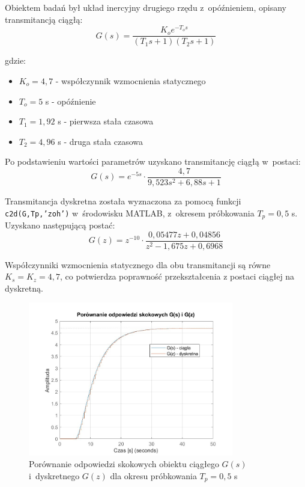 \documentclass[a4paper,titlepage,11pt,floatssmall]{mwrep}
\begin{document}
Obiektem badań był układ inercyjny drugiego rzędu z~opóźnieniem, opisany transmitancją ciągłą:
\begin{equation}
    G(s) = \frac{K_o e^{-T_o s}}{(T_1 s + 1)(T_2 s + 1)}
\end{equation}

gdzie:
\begin{itemize}
    \item $K_o = 4,7$ - współczynnik wzmocnienia statycznego
    \item $T_o = 5$ s - opóźnienie
    \item $T_1 = 1,92$ s - pierwsza stała czasowa
    \item $T_2 = 4,96$ s - druga stała czasowa
\end{itemize}

Po podstawieniu wartości parametrów uzyskano transmitancję ciągłą w~postaci:
\begin{equation}
    G(s) = e^{-5s} \cdot \frac{4,7}{9,523s^2 + 6,88s + 1}
\end{equation}

Transmitancja dyskretna została wyznaczona za pomocą funkcji \texttt{c2d(G,Tp,'zoh')} w~środowisku MATLAB, z~okresem próbkowania $T_p = 0,5$ s. Uzyskano następującą postać:
\begin{equation}
    G(z) = z^{-10} \cdot \frac{0,05477z + 0,04856}{z^2 - 1,675z + 0,6968}
\end{equation}

Współczynniki wzmocnienia statycznego dla obu transmitancji są równe $K_s = K_z = 4,7$, co potwierdza poprawność przekształcenia z postaci ciągłej na dyskretną.

\begin{figure}[H]
    \centering
    \includegraphics[width=0.8\textwidth]{kod/wykresy/zad1.jpg}
    \caption{Porównanie odpowiedzi skokowych obiektu ciągłego $G(s)$ i~dyskretnego $G(z)$ dla okresu próbkowania $T_p = 0,5$ s}
    \label{fig:odp_skokowe}
\end{figure}
\end{document}
